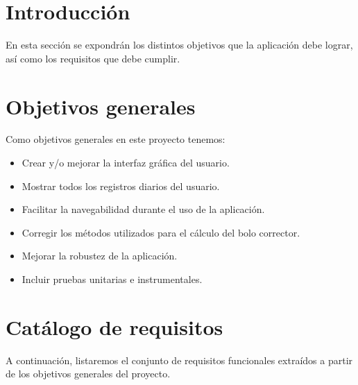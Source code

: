 
\section{Introducción}
En esta sección se expondrán los distintos objetivos que la aplicación debe lograr, así como los requisitos que debe cumplir.
\section{Objetivos generales}
Como objetivos generales en este proyecto tenemos:
\begin{itemize}
	\item Crear y/o mejorar la interfaz gráfica del usuario.
	\item Mostrar todos los registros diarios del usuario.
	\item Facilitar la navegabilidad durante el uso de la aplicación.
	\item Corregir los métodos utilizados para el cálculo del bolo corrector.
	\item Mejorar la robustez de la aplicación.
	\item Incluir pruebas unitarias e instrumentales.
\end{itemize}
\section{Catálogo de requisitos}
A continuación, listaremos el conjunto de requisitos funcionales extraídos a partir de los objetivos generales del proyecto.
